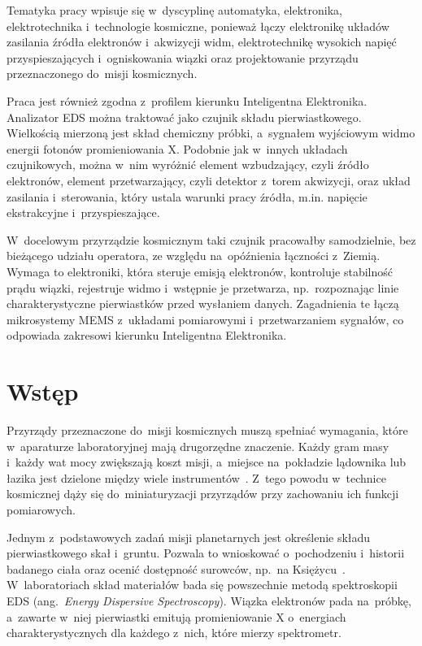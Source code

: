 Tematyka pracy wpisuje się w~dyscyplinę automatyka, elektronika,
elektrotechnika i~technologie kosmiczne, ponieważ łączy elektronikę
układów zasilania źródła elektronów i~akwizycji widm, elektrotechnikę
wysokich napięć przyspieszających i~ogniskowania wiązki oraz
projektowanie przyrządu przeznaczonego do~misji kosmicznych.

Praca jest również zgodna z~profilem kierunku Inteligentna Elektronika.
Analizator EDS można traktować jako czujnik składu pierwiastkowego.
Wielkością mierzoną jest skład chemiczny próbki, a~sygnałem wyjściowym
widmo energii fotonów promieniowania X. Podobnie jak w~innych układach
czujnikowych, można w~nim wyróżnić element wzbudzający, czyli źródło
elektronów, element przetwarzający, czyli detektor z~torem akwizycji,
oraz układ zasilania i~sterowania, który ustala warunki pracy źródła,
m.in. napięcie ekstrakcyjne i~przyspieszające.

W~docelowym przyrządzie kosmicznym taki czujnik pracowałby samodzielnie,
bez bieżącego udziału operatora, ze względu na~opóźnienia łączności
z~Ziemią. Wymaga to elektroniki, która steruje emisją elektronów,
kontroluje stabilność prądu wiązki, rejestruje widmo i~wstępnie je
przetwarza, np.~rozpoznając linie charakterystyczne pierwiastków przed
wysłaniem danych. Zagadnienia te łączą mikrosystemy MEMS z~układami
pomiarowymi i~przetwarzaniem sygnałów, co odpowiada zakresowi kierunku
Inteligentna Elektronika.


\chapter{Wstęp}

Przyrządy przeznaczone do~misji kosmicznych muszą spełniać wymagania,
które w~aparaturze laboratoryjnej mają drugorzędne znaczenie. Każdy
gram masy i~każdy wat mocy zwiększają koszt misji, a~miejsce
na~pokładzie lądownika lub łazika jest dzielone między wiele
instrumentów~\cite{TODO-budzet}. Z~tego powodu w~technice kosmicznej
dąży się do~miniaturyzacji przyrządów przy zachowaniu ich funkcji
pomiarowych.

Jednym z~podstawowych zadań misji planetarnych jest określenie składu
pierwiastkowego skał i~gruntu. Pozwala to wnioskować o~pochodzeniu
i~historii badanego ciała oraz ocenić dostępność surowców, np.~na
Księżycu~\cite{TODO-sklad}. W~laboratoriach skład materiałów bada się
powszechnie metodą spektroskopii EDS
(ang.~\textit{Energy Dispersive Spectroscopy}). Wiązka elektronów
pada na~próbkę, a~zawarte w~niej pierwiastki emitują promieniowanie X
o~energiach charakterystycznych dla każdego z~nich, które mierzy
spektrometr.

